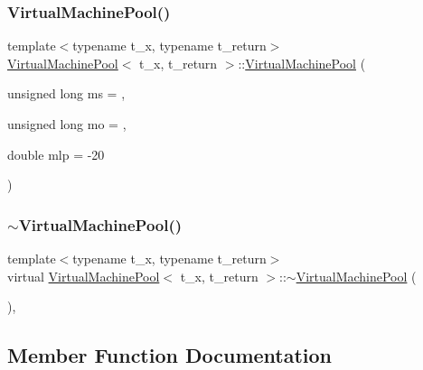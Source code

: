 \subsubsection{\texorpdfstring{Virtual\+Machine\+Pool()}{VirtualMachinePool()}}
{\footnotesize\ttfamily template$<$typename t\+\_\+x, typename t\+\_\+return$>$ \\
\hyperlink{class_virtual_machine_pool}{Virtual\+Machine\+Pool}$<$ t\+\_\+x, t\+\_\+return $>$\+::\hyperlink{class_virtual_machine_pool}{Virtual\+Machine\+Pool} (\begin{DoxyParamCaption}\item[{unsigned long}]{ms = {},  }\item[{unsigned long}]{mo = {},  }\item[{double}]{mlp = {\ttfamily -\/20} }\end{DoxyParamCaption})\hspace{0.3cm}{\ttfamily [inline]}}

\mbox{\label{class_virtual_machine_pool_a8fd087ac2d947b46b4be4d5e1baf1682}} 
\subsubsection{\texorpdfstring{$\sim$\+Virtual\+Machine\+Pool()}{~VirtualMachinePool()}}
{\footnotesize\ttfamily template$<$typename t\+\_\+x, typename t\+\_\+return$>$ \\
virtual \hyperlink{class_virtual_machine_pool}{Virtual\+Machine\+Pool}$<$ t\+\_\+x, t\+\_\+return $>$\+::$\sim$\hyperlink{class_virtual_machine_pool}{Virtual\+Machine\+Pool} (\begin{DoxyParamCaption}{ }\end{DoxyParamCaption})\hspace{0.3cm}{\ttfamily [inline]}, {\ttfamily [virtual]}}



\subsection{Member Function Documentation}
\mbox{\label{class_virtual_machine_pool_a022aad4a11f24264fd7d11060d041852}} 
